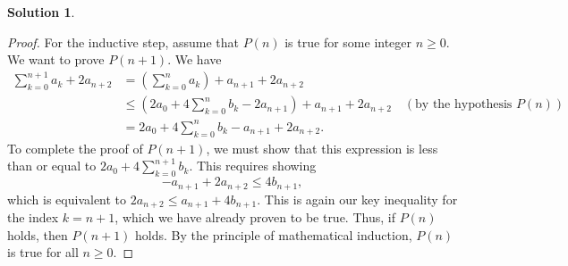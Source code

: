 \documentclass[12pt]{article}
\theoremstyle{definition}
\newtheorem*{solution}{\normalfont\textbf{Solution}}
\begin{document}
\begin{enumerate}[leftmargin=*]
\begin{solution}
\begin{proof}
                For the inductive step, assume that \(P(n)\) is true for some integer \(n \geq 0\). We want to prove \(P(n+1)\). We have
                \begin{align*}
                    \sum_{k=0}^{n+1} a_k + 2a_{n+2} &= \left(\sum_{k=0}^{n} a_k\right) + a_{n+1} + 2a_{n+2} \\
                    &\leq \left(2a_0 + 4\sum_{k=0}^{n} b_k - 2a_{n+1}\right) + a_{n+1} + 2a_{n+2} \quad (\text{by the hypothesis } P(n)) \\
                    &= 2a_0 + 4\sum_{k=0}^{n} b_k - a_{n+1} + 2a_{n+2}.
                \end{align*}
                To complete the proof of \(P(n+1)\), we must show that this expression is less than or equal to \(2a_0 + 4\sum_{k=0}^{n+1} b_k\). This requires showing
                \[
                - a_{n+1} + 2a_{n+2} \leq 4b_{n+1},
                \]
                which is equivalent to \(2a_{n+2} \leq a_{n+1} + 4b_{n+1}\). This is again our key inequality for the index \(k=n+1\), which we have already proven to be true. Thus, if \(P(n)\) holds, then \(P(n+1)\) holds. By the principle of mathematical induction, \(P(n)\) is true for all \(n \geq 0\).


\end{proof}
\end{solution}
\end{enumerate}
\end{document}

